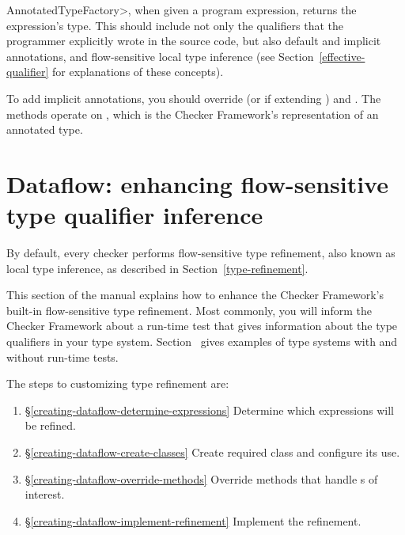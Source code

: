 \<AnnotatedTypeFactory>, when given a program
expression, returns the expression's type.  This should include not only
the qualifiers that the programmer explicitly wrote in the source code, but
also default and implicit annotations, and flow-sensitive local type
inference (see Section~\ref{effective-qualifier} for explanations of these
concepts).

To add implicit annotations, you should override
(or
if extending )
and
.
The methods operate on ,
which is the Checker Framework's representation of an annotated type.



\section{Dataflow: enhancing flow-sensitive type qualifier inference\label{creating-dataflow}}

By default, every checker performs flow-sensitive type refinement, also known as
local type inference, as described
in Section~\ref{type-refinement}.

This section of the manual explains how to enhance the Checker Framework's
built-in flow-sensitive type refinement.
Most commonly, you will inform the Checker Framework about a run-time test
that gives information about the type qualifiers in your type system.
Section~ gives examples of
type systems with and without run-time tests.

The steps to customizing type refinement are:
\begin{enumerate}
\item{\S\ref{creating-dataflow-determine-expressions}}
  Determine which expressions will be refined.
\item{\S\ref{creating-dataflow-create-classes}}
  Create required class and configure its use.
\item{\S\ref{creating-dataflow-override-methods}}
  Override methods that handle s of interest.
\item{\S\ref{creating-dataflow-implement-refinement}}
  Implement the refinement.
\end{enumerate}

